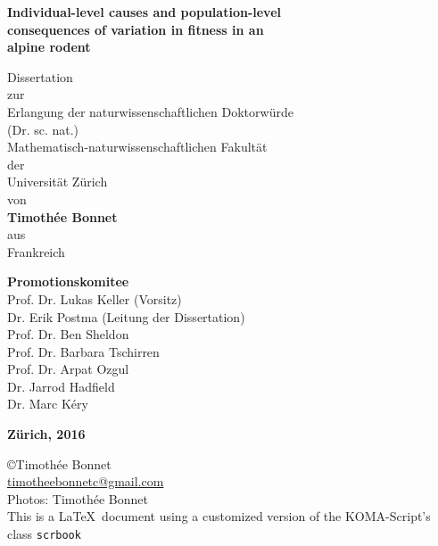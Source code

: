 \begin{titlepage}
	\thispagestyle{empty}
    \begin{center}
				 {\onehalfspacing \LARGE\selectfont\upshape\bfseries{Individual-level causes and population-level\\consequences of variation in fitness in an\\alpine rodent\\}}
				
				\vspace{1cm}
				
				\noindent\makebox[\linewidth]{\rule{0.8\paperwidth}{1pt}}
        
        \vspace{1cm}
				{\fontsize{22}{32pt}
				\doublespacing
        Dissertation
				\\
				zur
				\\
				Erlangung der naturwissenschaftlichen Doktorw\"urde
				\\
        (Dr. sc. nat.)
				\\
				Mathematisch-naturwissenschaftlichen Fakult\"at
				\\
				der
				\\
				Universit\"at Z\"urich
				\\
				von
				\\
        \vspace{1cm}
        \textbf{Timoth\'ee Bonnet}
        \\
				aus
				\\
				Frankreich
				
				\vspace{1cm}
				\textbf{Promotionskomitee}
				\\
				Prof. Dr. Lukas Keller (Vorsitz)
				\\
				Dr. Erik Postma (Leitung der Dissertation)
				\\
				Prof. Dr. Ben Sheldon
				\\
				Prof. Dr. Barbara Tschirren
				\\
				Prof. Dr. Arpat Ozgul
				\\
				Dr. Jarrod Hadfield
				\\
				Dr. Marc K\'ery
				\\
				}
        \vfill
        
        \textbf{Z\"urich, 2016}
    \end{center}
	
\end{titlepage}

	\clearpage
\begin{titlepage}
	\thispagestyle{empty}

\null\vfill
\noindent \copyright  Timoth\'ee Bonnet\\
\href{mailto:timotheebonnetc@gmail.com}{timotheebonnetc@gmail.com}\\
Photos: Timoth\'ee Bonnet\\
This is a \LaTeX ~document using a customized version of the KOMA-Script's class \texttt{scrbook}
\end{titlepage}